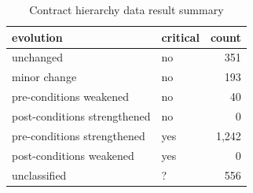 \begin{table}[]
	\centering
	\caption{Contract hierarchy data result summary}
	\label{tab:results-hierarchy}
	\begin{tabular}{|l|l|r|} \hline
		evolution & critical & count \\ \hline
		unchanged & no & 351  \\
		minor change & no & 193  \\
		pre-conditions weakened & no & 40  \\
		post-conditions strengthened & no & 0  \\ \hline
		pre-conditions strengthened & yes & 1,242  \\
		post-conditions weakened & yes & 0  \\ \hline
		unclassified & ? & 556  \\ \hline
	\end{tabular}
\end{table}
